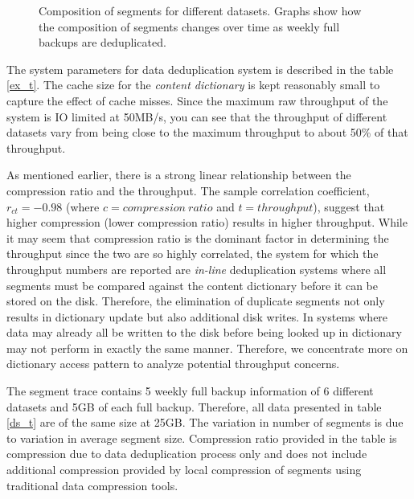 \begin{figure*}[!t]
\centerline{
\hfil
{}
\hfil
{}}
\centerline{
\hfil
{}
\hfil
{}
}
\caption{Composition of segments for different datasets. Graphs show how the composition of segments changes over time as weekly full backups are deduplicated.}
\label{fig_sim}
\end{figure*}

The system parameters for data deduplication system is described in the table \ref{ex_t}. The cache size for the \emph{content dictionary} is kept reasonably small to capture the effect of cache misses. Since the maximum raw throughput of the system is IO limited at 50MB/s, you can see that the throughput of different datasets vary from being close to the maximum throughput to about 50\% of that throughput. 

As mentioned earlier, there is a strong linear relationship between the compression ratio and the throughput. The sample correlation coefficient, $r_{ct} = -0.98$ (where $c=compression\ ratio$ and $t=throughput$), suggest that higher compression (lower compression ratio) results in higher throughput. While it may seem that compression ratio is the dominant factor in determining the throughput since the two are so highly correlated, the system for which the throughput numbers are reported are \emph{in-line} deduplication systems where all segments must be compared against the content dictionary before it can be stored on the disk. Therefore, the elimination of duplicate segments not only results in dictionary update but also additional disk writes. In systems where data may already all be written to the disk before being looked up in dictionary may not perform in exactly the same manner. Therefore, we concentrate more on dictionary access pattern to analyze potential throughput concerns.

The segment trace contains 5 weekly full backup information of 6 different datasets and 5GB of each full backup. Therefore, all data presented in table \ref{ds_t} are of the same size at 25GB. The variation in number of segments is due to variation in average segment size. Compression ratio provided in the table is compression due to data deduplication process only and does not include additional compression provided by local compression of segments using traditional data compression tools. 



